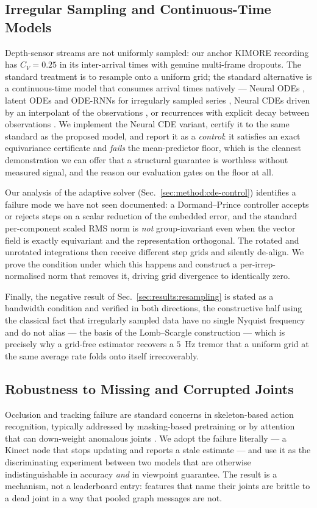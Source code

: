 \documentclass[10pt,journal]{IEEEtran}
\begin{document}
\subsection{Irregular Sampling and Continuous-Time Models}
Depth-sensor streams are not uniformly sampled: our anchor KIMORE recording has $C_V=0.25$ in its inter-arrival times with genuine multi-frame dropouts. The standard treatment is to resample onto a uniform grid; the standard alternative is a continuous-time model that consumes arrival times natively --- Neural ODEs \cite{chen2018neuralode}, latent ODEs and ODE-RNNs for irregularly sampled series \cite{rubanova2019odernn}, Neural CDEs driven by an interpolant of the observations \cite{kidger2020neuralcde}, or recurrences with explicit decay between observations \cite{che2018grud}. We implement the Neural CDE variant, certify it to the same standard as the proposed model, and report it as a \emph{control}: it satisfies an exact equivariance certificate and \emph{fails} the mean-predictor floor, which is the cleanest demonstration we can offer that a structural guarantee is worthless without measured signal, and the reason our evaluation gates on the floor at all.

Our analysis of the adaptive solver (Sec.~\ref{sec:method:cde-control}) identifies a failure mode we have not seen documented: a Dormand--Prince controller \cite{dormand1980prince} accepts or rejects steps on a scalar reduction of the embedded error, and the standard per-component scaled RMS norm is \emph{not} group-invariant even when the vector field is exactly equivariant and the representation orthogonal. The rotated and unrotated integrations then receive different step grids and silently de-align. We prove the condition under which this happens and construct a per-irrep-normalised norm that removes it, driving grid divergence to identically zero.

Finally, the negative result of Sec.~\ref{sec:results:resampling} is stated as a bandwidth condition and verified in both directions, the constructive half using the classical fact that irregularly sampled data have no single Nyquist frequency and do not alias --- the basis of the Lomb--Scargle construction \cite{vanderplas2018lombscargle} --- which is precisely why a grid-free estimator recovers a $5$~Hz tremor that a uniform grid at the same average rate folds onto itself irrecoverably.

\subsection{Robustness to Missing and Corrupted Joints}
Occlusion and tracking failure are standard concerns in skeleton-based action recognition, typically addressed by masking-based pretraining or by attention that can down-weight anomalous joints \cite{yan2018stgcn}. We adopt the failure literally --- a Kinect node that stops updating and reports a stale estimate --- and use it as the discriminating experiment between two models that are otherwise indistinguishable in accuracy \emph{and} in viewpoint guarantee. The result is a mechanism, not a leaderboard entry: features that name their joints are brittle to a dead joint in a way that pooled graph messages are not.
\end{document}
